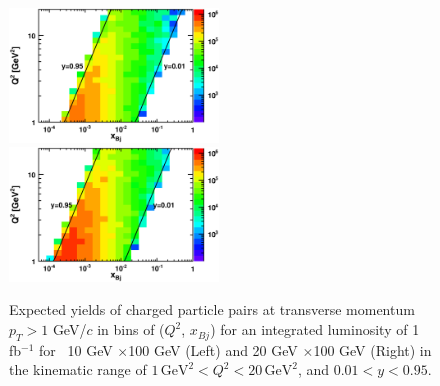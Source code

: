 \begin{figure} 
\begin{center}
\includegraphics[width=0.495\textwidth]
{plots/chpt6/q2vx_paircount_10x100_1fb-1.eps}
\includegraphics[width=0.495\textwidth]
{plots/chpt6/q2vx_paircount_20x100_1fb-1.eps}
\end{center} 
\caption[Expected yields of charged
particle pairs in specified kinematics region]{Expected yields of charged
particle pairs at transverse momentum $p_{T}>1$ GeV/$c$ in bins of 
($Q^{2}$, $x_{Bj}$) for an integrated luminosity of 1 fb$^{-1}$ for 
\ep\ 10 GeV $\times$100 GeV (Left) and 20 GeV $\times$100 GeV (Right) in the kinematic
range of $1\, \textrm{GeV}^{2}<Q^{2}<20 \, \textrm{GeV}^{2}$, and $0.01<y<0.95$.}
\label{fig:Q2VsxBj}
\end{figure}

